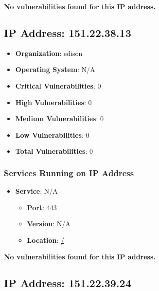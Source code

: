 \documentclass{article}
\begin{document}
\textbf{No vulnerabilities found for this IP address.}




\clearpage



\subsection{IP Address: 151.22.38.13}

\begin{itemize}
    \item \textbf{Organization}: edison
    \item \textbf{Operating System}:  N/A 
    \item \textbf{Critical Vulnerabilities}: 0
    \item \textbf{High Vulnerabilities}: 0
    \item \textbf{Medium Vulnerabilities}: 0
    \item \textbf{Low Vulnerabilities}: 0
    \item \textbf{Total Vulnerabilities}: 0
\end{itemize}

\subsubsection*{Services Running on IP Address}

\begin{itemize}
    
        \item \textbf{Service}: N/A
        \begin{itemize}
            \item \textbf{Port}: 443
            \item \textbf{Version}:  N/A 
            \item \textbf{Location}: \href{ / }{ / }
        \end{itemize}
    
\end{itemize}


\textbf{No vulnerabilities found for this IP address.}




\clearpage



\subsection{IP Address: 151.22.39.24}
\end{document}
